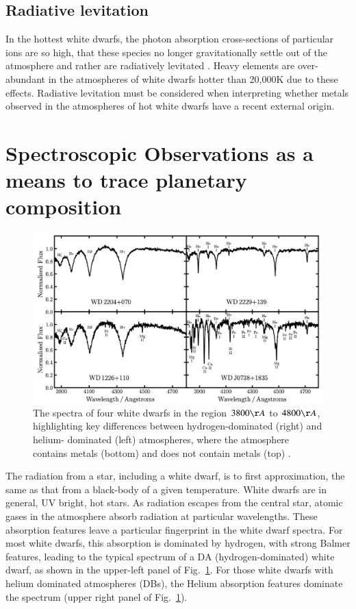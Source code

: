 \documentclass[onecolumn,authoryear]{els-mrw}
\begin{document}
\subsection{Radiative levitation}
In the hottest white dwarfs, the photon absorption cross-sections of particular ions are so high, that these species no longer gravitationally settle out of the atmosphere and rather are radiatively levitated \citep{Chayer1995}. Heavy elements are over-abundant in the atmospheres of white dwarfs hotter than 20,000K due to these effects. Radiative levitation must be considered when interpreting whether metals observed in the atmospheres of hot white dwarfs have a recent external origin.




    
    \section{Spectroscopic Observations as a means to trace planetary composition}




\begin{figure}[t]
\centering
\includegraphics[width=.8\textwidth]{WDspectra_harrison.png}
\caption{The spectra of four white dwarfs in the region $3800\AA$ to $4800\AA$, highlighting key differences between hydrogen-dominated (right) and helium- dominated (left) atmospheres, where the atmosphere contains metals (bottom) and does not contain metals (top) \cite{harrison_thesis}. }
\label{fig:spectra}
\end{figure}


The radiation from a star, including a white dwarf, is to first approximation, the same as that from a black-body of a given temperature. White dwarfs are in general, UV bright, hot stars. As radiation escapes from the central star, atomic gases in the atmosphere absorb radiation at particular wavelengths. These absorption features leave a particular fingerprint in the white dwarf spectra. For most white dwarfs, this absorption is dominated by hydrogen, with strong Balmer features, leading to the typical spectrum of a DA (hydrogen-dominated) white dwarf, as shown in the upper-left panel of Fig.~\ref{fig:spectra}. For those white dwarfs with helium dominated atmospheres (DBs), the Helium absorption features dominate the spectrum (upper right panel of Fig.~\ref{fig:spectra}). 
\end{document}
